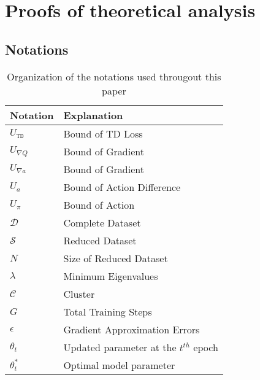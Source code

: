\clearpage
\section{Proofs of theoretical analysis}
{\subsection{Notations}}

\begin{table}[ht]
    \centering
    {\begin{tabular}{ll}
    \toprule
    Notation & Explanation \\
    \midrule
    \hspace{0.3cm} $U_\mathtt{TD}$ & Bound of TD Loss \\
    \hspace{0.3cm} $U_{\nabla Q}$ & Bound of Gradient \\
    \hspace{0.3cm} $U_{\nabla a}$ & Bound of Gradient \\
    \hspace{0.3cm} $U_a$ & Bound of Action Difference \\
    \hspace{0.3cm} $U_\pi$ & Bound of Action \\
    \hspace{0.3cm} $\mathcal{D}$ & Complete Dataset \\
    \hspace{0.3cm} $\mathcal{S}$ & Reduced Dataset \\
    \hspace{0.3cm} $N$ & Size of Reduced Dataset \\
    \hspace{0.3cm} $\lambda$ & Minimum Eigenvalues \\
    \hspace{0.3cm} $\mathcal{C}$ & Cluster \\
    \hspace{0.3cm} $G$ & Total Training Steps \\
    \hspace{0.3cm} $\epsilon$ & Gradient Approximation Errors \\
    \hspace{0.3cm} $\theta_t$ & Updated parameter at the $t^{th}$ epoch \\
    \hspace{0.3cm} $\theta_t^*$ & Optimal model parameter \\
    \bottomrule
    \end{tabular}}
    {\caption{Organization of the notations used througout this paper}}
    \label{tab: notation}
\end{table}


